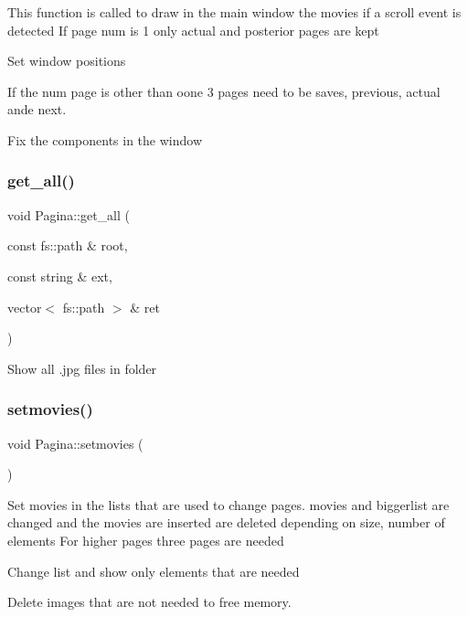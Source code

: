This function is called to draw in the main window the movies if a scroll event is detected If page num is 1 only actual and posterior pages are kept

Set window positions

If the num page is other than oone 3 pages need to be saves, previous, actual ande next.

Fix the components in the window\mbox{\label{classPagina_a6add287b069713f6e424d107989c3742}} 
\subsubsection{\texorpdfstring{get\+\_\+all()}{get\_all()}}
{\footnotesize\ttfamily void Pagina\+::get\+\_\+all (\begin{DoxyParamCaption}\item[{const fs\+::path \&}]{root,  }\item[{const string \&}]{ext,  }\item[{vector$<$ fs\+::path $>$ \&}]{ret }\end{DoxyParamCaption})}

Show all .jpg files in folder \mbox{\label{classPagina_a70b6828244ce579b7f31a5834439a4c6}} 
\subsubsection{\texorpdfstring{setmovies()}{setmovies()}}
{\footnotesize\ttfamily void Pagina\+::setmovies (\begin{DoxyParamCaption}{ }\end{DoxyParamCaption})}

Set movies in the lists that are used to change pages. movies and biggerlist are changed and the movies are inserted are deleted depending on size, number of elements For higher pages three pages are needed

Change list and show only elements that are needed

Delete images that are not needed to free memory.\mbox{\label{classPagina_a44d18e2ed349bf65f806ed1a5b2bb720}} 
